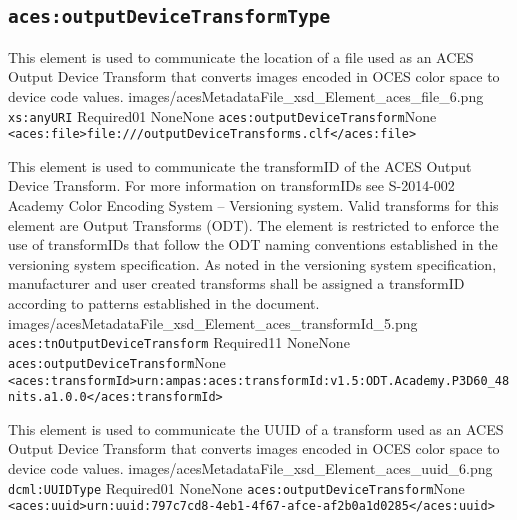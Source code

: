 \subsection{\texttt{aces:outputDeviceTransformType}}

		{This element is used to communicate the location of a file used as an ACES Output Device Transform that converts images encoded in OCES color space to device code values.}
		{images/acesMetadataFile_xsd_Element_aces_file_6.png}
		{\texttt{xs:anyURI}}
		{Required}{0}{1}
		{None}{None}
		{\texttt{aces:outputDeviceTransform}}{None}
		{\lstinline{<aces:file>file:///outputDeviceTransforms.clf</aces:file>}}

        {This element is used to communicate the transformID of the ACES Output Device Transform.  For more information on transformIDs see S-2014-002 Academy Color Encoding System -- Versioning system.  Valid transforms for this element are Output Transforms (ODT).  The element is restricted to enforce the use of transformIDs that follow the ODT naming conventions established in the versioning system specification.  As noted in the versioning system specification, manufacturer and user created transforms shall be assigned a transformID according to patterns established in the document.}
        {images/acesMetadataFile_xsd_Element_aces_transformId_5.png}
        {\texttt{aces:tnOutputDeviceTransform}}
        {Required}{1}{1}
        {None}{None}
        {\texttt{aces:outputDeviceTransform}}{None}
        {\lstinline{<aces:transformId>urn:ampas:aces:transformId:v1.5:ODT.Academy.P3D60_48nits.a1.0.0</aces:transformId>}}
        
		{This element is used to communicate the UUID of a transform used as an ACES Output Device Transform that converts images encoded in OCES color space to device code values.}
		{images/acesMetadataFile_xsd_Element_aces_uuid_6.png}
		{\texttt{dcml:UUIDType}}
		{Required}{0}{1}
		{None}{None}
		{\texttt{aces:outputDeviceTransform}}{None}
		{\lstinline{<aces:uuid>urn:uuid:797c7cd8-4eb1-4f67-afce-af2b0a1d0285</aces:uuid>}}
		